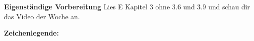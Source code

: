 \documentclass{uebung_cs}
\begin{document}
\textbf{Eigenständige Vorbereitung}
Lies  E Kapitel 3 ohne 3.6 und 3.9 und schau dir das  Video der Woche an.

\textbf{Zeichenlegende:}
\legende{}


\begin{aufgabe}[test]
\end{aufgabe}

\begin{aufgabe}[test]
\end{aufgabe}
\end{document}
